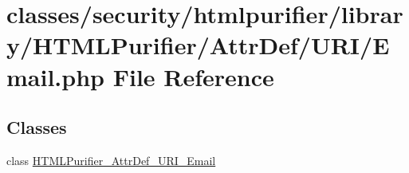 \hypertarget{Email_8php}{\section{classes/security/htmlpurifier/library/\+H\+T\+M\+L\+Purifier/\+Attr\+Def/\+U\+R\+I/\+Email.php File Reference}
\label{Email_8php}
}
\subsection*{Classes}
\begin{DoxyCompactItemize}
\item 
class \hyperlink{classHTMLPurifier__AttrDef__URI__Email}{H\+T\+M\+L\+Purifier\+\_\+\+Attr\+Def\+\_\+\+U\+R\+I\+\_\+\+Email}
\end{DoxyCompactItemize}
